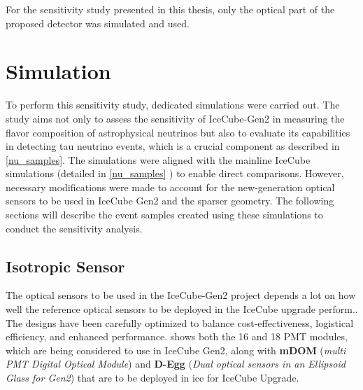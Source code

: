 For the sensitivity study presented in this thesis, only the optical part of the proposed detector was simulated and used. 

\section{Simulation}
\label{sec:gen2-sim}
To perform this sensitivity study, dedicated simulations were carried out. The study aims not only to assess the sensitivity of IceCube-Gen2 in measuring the flavor composition of astrophysical neutrinos but also to evaluate its capabilities in detecting tau neutrino events, which is a crucial component as described in \ref{nu_samples}. The simulations were aligned with the mainline IceCube simulations (detailed in \ref{nu_samples} ) to enable direct comparisons. However, necessary modifications were made to account for the new-generation optical sensors to be used in IceCube Gen2 and the sparser geometry. The following sections will describe the event samples created using these simulations to conduct the sensitivity analysis.

\subsection{Isotropic Sensor}
\label{sec:isopdom}
The optical sensors to be used in the IceCube-Gen2 project depends a lot on how well the reference optical sensors to be deployed in the IceCube upgrade perform.. The designs have been carefully optimized to balance cost-effectiveness, logistical efficiency, and enhanced performance.  shows both the 16 and 18 PMT modules, which are being considered to use in IceCube Gen2, along with \textbf{mDOM} (\emph{multi PMT Digital Optical Module})  and \textbf{D-Egg} (\emph{Dual optical sensors in an Ellipsoid Glass for Gen2})  that are to be deployed in ice for IceCube Upgrade.

